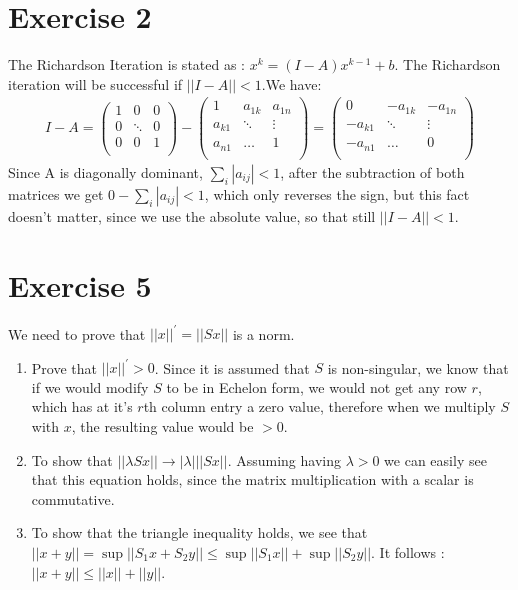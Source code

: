 \section{Exercise 2}
The Richardson Iteration is stated as : $ x^k = (I-A) x^{k-1} +b$. The Richardson iteration will be successful if $||I-A|| < 1 $.We have:
\begin{gather*}
I - A = 
\left( \begin{array}{ccc}
1 & 0 & 0\\
0 & \ddots & 0\\
0 & 0 & 1\\
\end{array}\right) 
-
\left( \begin{array}{ccc}
1 & a_{1k} & a_{1n}\\
a_{k1} & \ddots & \vdots \\
a_{n1} & \hdots & 1\\
\end{array}\right)
= 
\left( \begin{array}{ccc}
0 & -a_{1k} & -a_{1n}\\
-a_{k1} & \ddots & \vdots \\
-a_{n1} & \hdots & 0\\
\end{array}\right)
\end{gather*}
Since A is diagonally dominant, $\sum\limits_i |a_{ij}| < 1 $, after the subtraction of both matrices we get $0 - \sum\limits_i |a_{ij}| < 1 $, which only reverses the sign, but this fact doesn’t matter, since we use the absolute value, so that still $||I-A|| < 1$.
\section{Exercise 5}
We need to prove that $ ||x||^{'} = ||Sx||$ is a norm.
\begin{enumerate}
\item Prove that $||x||^{'} > 0$. Since it is assumed that $S$ is non-singular, we know that if we would modify $S$ to be in Echelon form, we would not get any row $r$, which has at it's $r$th column entry a zero value, therefore when we multiply $S$ with $x$, the resulting value would be $>0$.
\item To show that $||\lambda S x || \rightarrow |\lambda| ||S x||$. Assuming having $\lambda >0$ we can easily see that this equation holds, since the matrix multiplication with a scalar is commutative.
\item To show that the triangle inequality holds, we see that $|| x + y || = \sup{||S_1 x + S_2 y||} \leq \sup{|| S_1 x ||} + \sup{|| S_2 y||} $. It follows : $|| x+y || \leq ||x|| + ||y||$.
\end{enumerate}

